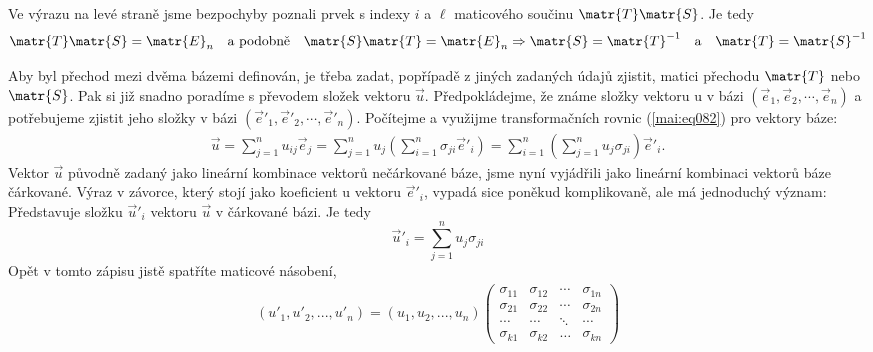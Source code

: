       Ve výrazu na levé straně jsme bezpochyby poznali prvek s indexy \(i\) a \(\ell\) maticového
      součinu \(\matr{T}\matr{S}\). Je tedy
      \begin{equation}\label{mai:eq083}
        \matr{T}\matr{S} = \matr{E}_n \quad\text{a podobně}\quad
        \matr{S}\matr{T} = \matr{E}_n \Rightarrow 
        \matr{S} = \matr{T}^{-1} \quad\text{a}\quad
        \matr{T} = \matr{S}^{-1}
      \end{equation}

      Aby byl přechod mezi dvěma bázemi definován, je třeba zadat, popřípadě z jiných zadaných údajů
      zjistit, matici přechodu \(\matr{T}\) nebo \(\matr{S}\). Pak si již snadno poradíme s převodem
      složek vektoru \(\vec{u}\). Předpokládejme, že známe složky vektoru u v bázi \((\vec{e}_1,
      \vec{e}_2, \cdots, \vec{e}_n)\) a potřebujeme zjistit jeho složky v bázi \((\vec{e}'_1,
      \vec{e}'_2, \cdots, \vec{e}'_n)\). Počítejme a využijme transformačních rovnic
      (\ref{mai:eq082}) pro vektory báze:
      \begin{gather*}
        \vec{u}= \sum_{j=1}^nu_{ij}\vec{e}_j 
               = \sum_{j=1}^nu_{j}\left(\sum_{i=1}^n\sigma_{ji}\vec{e}'_i\right)
               = \sum_{i=1}^n\left(\sum_{j=1}^nu_{j}\sigma_{ji}\right)\vec{e}'_i.
      \end{gather*} 
      Vektor \(\vec{u}\) původně zadaný jako lineární kombinace vektorů nečárkované báze, jsme nyní
      vyjádřili jako lineární kombinaci vektorů báze čárkované. Výraz v závorce, který stojí jako
      koeficient u vektoru \(\vec{e}'_i\), vypadá sice poněkud komplikovaně, ale má jednoduchý
      význam: Představuje složku \(\vec{u}'_i\) vektoru \(\vec{u}\) v čárkované bázi. Je tedy
      \begin{equation*}
        \vec{u}'_i= \sum_{j=1}^nu_{j}\sigma_{ji}
      \end{equation*}
      Opět v tomto zápisu jistě spatříte maticové násobení,
      \begingroup
      \renewcommand\arraystretch{0.9}
      \renewcommand\arraycolsep{3pt}
      \begin{gather*}
        (u'_1, u'_2, ..., u'_n) = (u_1, u_2, ..., u_n)
        \begin{pmatrix}
          \sigma_{11} & \sigma_{12} & \cdots & \sigma_{1n}    \\
          \sigma_{21} & \sigma_{22} & \cdots & \sigma_{2n}    \\
          \cdots      & \cdots      & \ddots & \cdots         \\
          \sigma_{k1} & \sigma_{k2} & \ldots & \sigma_{kn}
        \end{pmatrix}
      \end{gather*} 
